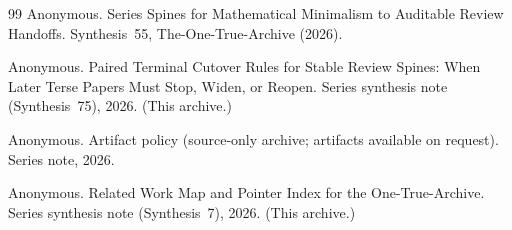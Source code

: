 \documentclass[11pt]{article}
\begin{document}
\begin{thebibliography}{99}
Anonymous.
\newblock Series Spines for Mathematical Minimalism to Auditable Review Handoffs.
\newblock Synthesis~55, The-One-True-Archive (2026).

Anonymous.
\newblock Paired Terminal Cutover Rules for Stable Review Spines: When Later Terse Papers Must Stop, Widen, or Reopen.
\newblock Series synthesis note (Synthesis~75), 2026. (This archive.)

Anonymous.
\newblock Artifact policy (source-only archive; artifacts available on request).
\newblock Series note, 2026.

Anonymous.
\newblock Related Work Map and Pointer Index for the One-True-Archive.
\newblock Series synthesis note (Synthesis~7), 2026. (This archive.)

\end{thebibliography}
\end{document}
